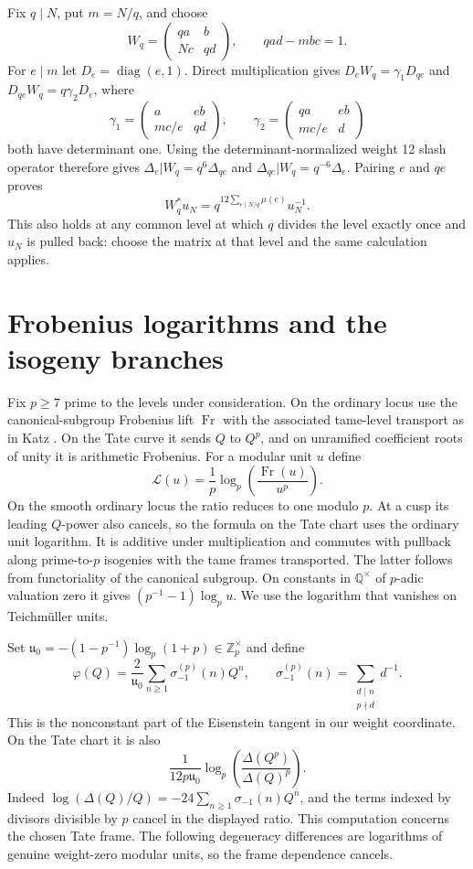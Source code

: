 \documentclass[11pt]{article}
\newcommand{\Frob}{\operatorname{Fr}}
\newcommand{\Zp}{\mathbb Z_p}
\begin{document}
Fix $q\mid N$, put $m=N/q$, and choose
\[
 W_q=\begin{pmatrix}qa&b\\ Nc&qd\end{pmatrix},\qquad qad-mbc=1 .
\]
For $e\mid m$ let $D_e=\operatorname{diag}(e,1)$. Direct multiplication
gives $D_eW_q=\gamma_1D_{qe}$ and $D_{qe}W_q=q\gamma_2D_e$, where
\[
 \gamma_1=\begin{pmatrix}a&eb\\mc/e&qd\end{pmatrix},\qquad
 \gamma_2=\begin{pmatrix}qa&eb\\mc/e&d\end{pmatrix}
\]
both have determinant one. Using the determinant-normalized weight
12 slash operator therefore gives
$\Delta_e|W_q=q^6\Delta_{qe}$ and
$\Delta_{qe}|W_q=q^{-6}\Delta_e$. Pairing $e$ and $qe$ proves
\begin{equation}\label{fricke}
        W_q^*u_N=q^{12\sum_{e\mid N/q}\mu(e)}u_N^{-1}.
\end{equation}
This also holds at any common level at which $q$ divides the level
exactly once and $u_N$ is pulled back: choose the matrix at that level
and the same calculation applies.

\section{Frobenius logarithms and the isogeny branches}
Fix $p\ge7$ prime to the levels under consideration. On the ordinary
locus use the canonical-subgroup Frobenius lift $\Frob$ with the
associated tame-level transport as in Katz \cite{Katz}. On the Tate
curve it sends $Q$ to $Q^p$, and on unramified coefficient roots of
unity it is arithmetic Frobenius. For a modular unit $u$ define
\[
   \mathcal L(u)=\frac1p\log_p\left(\frac{\Frob(u)}{u^p}\right).
\]
On the smooth ordinary locus the ratio reduces to one modulo $p$.
At a cusp its leading $Q$-power also cancels, so the formula on the
Tate chart uses the ordinary unit logarithm. It is additive under
multiplication and commutes with pullback along prime-to-$p$ isogenies
with the tame frames transported. The latter follows from functoriality
of the canonical subgroup. On constants in $\mathbb Q^\times$ of
$p$-adic valuation zero it gives
$(p^{-1}-1)\log_p u$. We use the logarithm that vanishes on
Teichm\"uller units.

Set $\mathfrak u_0=-(1-p^{-1})\log_p(1+p)\in\Zp^\times$ and define
\[
 \varphi(Q)=\frac{2}{\mathfrak u_0}\sum_{n\ge1}\sigma_{-1}^{(p)}(n)Q^n,\qquad
 \sigma_{-1}^{(p)}(n)=\sum_{\substack{d\mid n\\p\nmid d}}d^{-1}.
\]
This is the nonconstant part of the Eisenstein tangent in our
weight coordinate. On the Tate chart it is also
\[
 \frac{1}{12p\mathfrak u_0}
 \log_p\!\left(\frac{\Delta(Q^p)}{\Delta(Q)^p}\right).
\]
Indeed $\log(\Delta(Q)/Q)=-24\sum_{n\ge1}\sigma_{-1}(n)Q^n$,
and the terms indexed by divisors divisible by $p$ cancel in the
displayed ratio. This computation concerns the chosen Tate frame.
The following degeneracy differences are logarithms of genuine
weight-zero modular units, so the frame dependence cancels.
\end{document}
